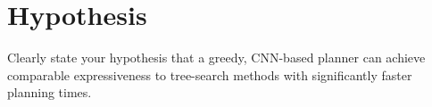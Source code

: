 \section{Hypothesis}

\begin{outline}
  Clearly state your hypothesis that a greedy, CNN-based planner can
  achieve comparable expressiveness to tree-search methods with
  significantly faster planning times.
\end{outline}
